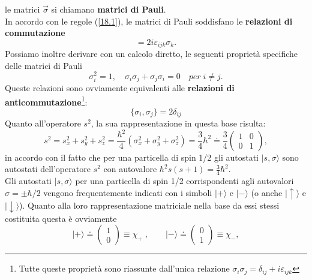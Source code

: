 le matrici $\vec{\sigma}$ si chiamano \textbf{matrici di Pauli}.\\
In accordo con le regole (\ref{18.1}), le matrici di Pauli soddisfano le \textbf{relazioni di commutazione}
\begin{equation}
[\sigma_{i}, \sigma_{j}]=2i\varepsilon_{ijk}\sigma_{k} .
\end{equation}
Possiamo inoltre derivare con un calcolo diretto, le seguenti proprietà specifiche delle matrici di Pauli
\begin{equation}
\sigma_{i}^{2}=1, \quad \sigma_{i}\sigma_{j}+\sigma_{j}\sigma_{i}=0 \quad per \; i \neq j .
\end{equation}
Queste relazioni sono ovviamente equivalenti alle \textbf{relazioni di anticommutazione}\footnote{Tutte queste proprietà sono riassunte dall'unica relazione $\sigma_{i}\sigma_{j}=\delta_{ij}+i\varepsilon_{ijk}$}:
\begin{equation}
\lbrace\sigma_{i}, \sigma_{j}\rbrace=2\delta_{ij}
\end{equation}
Quanto all'operatore $s^{2}$, la sua rappresentazione in questa base risulta:
\begin{equation}
s^{2}=s_{x}^{2}+s_{y}^{2}+s_{z}^{2}=\frac{\hbar^{2}}{4}(\sigma_{x}^{2}+\sigma_{y}^{2}+\sigma_{z}^{2})=
\frac{3}{4}\hbar^{2}\doteq\frac{3}{4}\begin{pmatrix}
1 & 0 \\
0 & 1
\end{pmatrix} ,
\end{equation} 
in accordo con il fatto che per una particella di spin 1/2 gli autostati $\vert s, \sigma\rangle$ sono autostati  dell'operatore $s^{2}$ con autovalore $\hbar^{2}s(s+1)=\frac{3}{4}\hbar^{2}$.\\
Gli autostati $\vert s, \sigma\rangle$ per una particella di spin 1/2 corrispondenti agli autovalori $\sigma=\pm\hbar/2$ vengono frequentemente indicati con i simboli $\vert +\rangle$ e $\vert -\rangle$ (o anche $\vert \uparrow \rangle$ e $\vert \downarrow \rangle$). Quanto alla loro rappresentazione matriciale nella base da essi stessi costituita questa è ovviamente
\begin{equation}
\vert +\rangle\doteq\begin{pmatrix}
1 \\
0
\end{pmatrix}\equiv \chi_{+}\;, \qquad \vert - \rangle\doteq\begin{pmatrix}
0 \\
1
\end{pmatrix}\equiv \chi_{-} ,
\end{equation}
